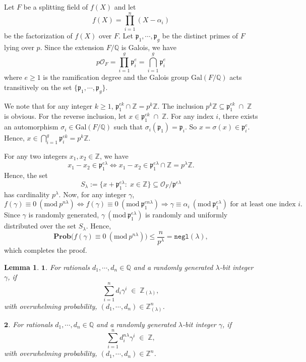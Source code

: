 \documentclass[11pt, lettersize, notitlepage, leqno, footskip=0.6cm]{article}
\newcommand{\bz}{\mathbb Z}
\newcommand{\bq}{\mathbb Q}
\newcommand{\pl}{\prod\limits}
\newcommand{\slim}{\sum\limits}
\newcommand{\ttt}{\texttt}
\newcommand{\Gal}{\mathrm{Gal}}
\newcommand{\negl}{\ttt{{negl}}}
\newcommand{\LRA}{\Longleftrightarrow}
\newcommand{\mc}{\mathcal}
\newcommand{\mbf}{\mathbf}
\newcommand{\mfp}{\mathfrak{p}}
\newcommand{\al}{\alpha}
\newcommand{\lam}{\lambda}
\newcommand{\bzlam}{\bz_{(\lam)}}
\newcommand{\sub}{\subseteq}
\newcommand{\vs}{\vspace{-0.15cm}}
\newcommand{\noin}{\noindent}
\newcommand{\op}{overwhelming probability}
\newcommand{\Mod}[1]{\ (\mathrm{mod}\ #1)}
\newtheorem{Lem}[Thm]{Lemma}
\numberwithin{equation}{section}
\begin{document}
\begin{prf} Let $F$ be a splitting field of $f(X)$ and let \vs $${f}(X) = \pl_{i=1}^n (X-\al_i)$$ be the factorization of ${f}(X)$ over $F$. Let $\mfp_{1},\cdots,\mfp_g$ be the distinct primes of $F$ lying over $p$. Since the extension $F/\bq$ is Galois, we have \vs $$p\mc{O}_F = \pl_{i=1}^{g} \mfp_i^e = \bigcap\limits_{i=1}^{g} \mfp_i^e$$ where $e\geq 1$ is the ramification degree and the Galois group $\Gal(F/\bq)$ acts transitively on the set $\{ \mfp_1,\cdots,\mfp_g\}$.

We note that for any integer $k\geq 1$, $\mfp_1^{ek}\cap \bz = p^{k}\bz$. The inclusion $p^{k}\bz\sub \mfp_1^{ek}\;\cap \;\bz$ is obvious. For the reverse inclusion, let $x\in \mfp_1^{ek}\;\cap\; \bz$. For any index $i$, there exists an automorphism $\sigma_i\in \Gal(F/\bq)$ such that $\sigma_i(\mfp_1) = \mfp_i$. So $x = \sigma(x) \in \mfp_i^e$. Hence, $x\in \bigcap\limits_{i=1}^g \mfp_i^{ek} = p^{k}\bz$.

For any two integers $x_1,x_2\in \bz$, we have \vs $$x_1-x_2\in \mfp_1^{e\lam}\LRA x_1-x_2\in \mfp_1^{e\lam}\cap \bz = p^{\lam}\bz.$$ Hence, the set \vs $$ S_{\lam}:= \{x + {\mfp_1^{e\lam}}:\;x\in\bz \}\sub \mc{O}_F/\mfp^{e\lam} $$ has cardinality $p^{\lam}$. Now, for any integer $\gamma$, \vs $$f(\gamma)\equiv 0 \Mod{p^{n\lam}} \LRA f(\gamma)\equiv 0 \Mod{\mfp_1^{en\lam}}  \Longrightarrow \gamma\equiv \al_i \Mod{\mfp_1^{e\lam}}\text{ for at least one index } i. $$  Since $\gamma$ is randomly generated, $\gamma\Mod{\mfp_1^{e\lam}}$ is randomly and uniformly distributed over the set $S_{\lam}$. Hence, \vs $$ \mbf{Prob}\big( f(\gamma)\equiv 0 \Mod{p^{n\lam}} \big)\leq \frac{n}{p^{\lam}} = \negl(\lam),$$ which completes the proof.\end{prf}

\begin{Lem}$\mbf{1}$. For rationals $d_1,\cdots, d_n\in \bq$ and a randomly generated $\lam$-bit integer $\gamma$, if \vs$$\sum\limits_{i=1}^n d_i\gamma^i\; \in \;\bzlam,$$ with \op, $(d_1,\cdots, d_n)\in \bzlam^n$.\vspace{0.1cm}

\noin $\mbf{2}$. For rationals $d_1,\cdots, d_n\in \bq$ and a randomly generated $\lam$-bit integer $\gamma$, if \vs $$\slim_{i=1}^n d_i^{n\lam}\gamma^i\; \in \;\bz,$$ with \op, $(d_1,\cdots, d_n)\in \bz^n$.\end{Lem}
\end{document}
